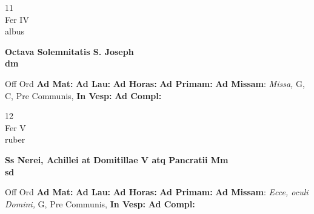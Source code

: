 \documentclass[10pt, openany]{book}
\begin{document}
    \begin{center}
        \begin{minipage}{3.5in}
            \vspace{2em}
            \begin{minipage}{0.5in}
                {\Huge 11} \\
                {\normalsize Fer IV} \\
                {\normalsize albus}
            \end{minipage}
            \begin{minipage}{3.0in}
                \textbf{ \large Octava Solemnitatis S. Joseph \\
                \textnormal{\normalsize dm}} \\ 
            \end{minipage}
            \begin{justify}Off Ord
                \textbf{Ad Mat: }
                \textbf{Ad Lau: }
                \textbf{Ad Horas: }
                \textbf{Ad Primam: }\textbf{Ad Missam}: \textit{Missa,} G, C, Pre Communis,  
                \textbf{In Vesp: }
                \textbf{Ad Compl: }
            \end{justify}
        \end{minipage}
    \end{center}

    \begin{center}
        \begin{minipage}{3.5in}
            \vspace{2em}
            \begin{minipage}{0.5in}
                {\Huge 12} \\
                {\normalsize Fer V} \\
                {\normalsize ruber}
            \end{minipage}
            \begin{minipage}{3.0in}
                \textbf{ \large Ss Nerei, Achillei at Domitillae V atq Pancratii Mm \\
                \textnormal{\normalsize sd}} \\ 
            \end{minipage}
            \begin{justify}Off Ord
                \textbf{Ad Mat: }
                \textbf{Ad Lau: }
                \textbf{Ad Horas: }
                \textbf{Ad Primam: }\textbf{Ad Missam}: \textit{Ecce, oculi Domini,} G, Pre Communis,  
                \textbf{In Vesp: }
                \textbf{Ad Compl: }
            \end{justify}
        \end{minipage}
    \end{center}
\end{document}
